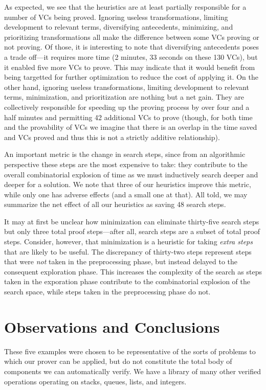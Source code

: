 As expected, we see that the heuristics are at least partially responsible for a number of VCs being proved.  Ignoring useless transformations, limiting development to relevant terms, diversifying antecedents, minimizing, and prioritizing transformations all make the difference between some VCs proving or not proving.  Of those, it is interesting to note that diversifying antecedents poses a trade off---it requires more time (2 minutes, 33 seconds on these 130 VCs), but it enabled five more VCs to prove.  This may indicate that it would benefit from being targetted for further optimization to reduce the cost of applying it.  On the other hand, ignoring useless transformations, limiting development to relevant terms, minimization, and prioritization are nothing but a net gain.  They are collectively responsible for speeding up the proving process by over four and a half minutes and permitting 42 additional VCs to prove (though, for both time and the provability of VCs we imagine that there is an overlap in the time saved and VCs proved and thus this is not a strictly additive relationship).

An important metric is the change in search steps, since from an algorithmic perspective these steps are the most expensive to take: they contribute to the overall combinatorial explosion of time as we must inductively search deeper and deeper for a solution.  We note that three of our heuristics improve this metric, while only one has adverse effects (and a small one at that).  All told, we may summarize the net effect of all our heuristics as saving 48 search steps.

It may at first be unclear how minimization can eliminate thirty-five search steps but only three total proof steps---after all, search steps are a subset of total proof steps.  Consider, however, that minimization is a heuristic for taking \emph{extra steps} that are likely to be useful.  The discrepancy of thirty-two steps represent steps that were \emph{not} taken in the preprocessing phase, but instead delayed to the consequent exploration phase.  This increases the complexity of the search as steps taken in the exporation phase contribute to the combinatorial explosion of the search space, while steps taken in the preprocessing phase do not.


\section{Observations and Conclusions\label{proverEvalConclusion}}
These five examples were chosen to be representative of the sorts of problems to which our prover can be applied, but do not constitute the total body of components we can automatically verify.  We have a library of many other verified operations operating on stacks, queues, lists, and integers.

